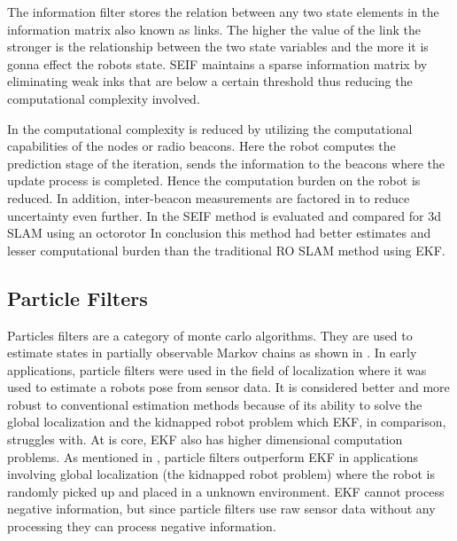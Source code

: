 \documentclass[conference]{IEEEtran}
\begin{document}
The information filter stores the relation between any two state elements in the information matrix also known as links. The higher the value of the link the stronger is the relationship between the two state variables and the more it is gonna effect the robots state. SEIF maintains a sparse information matrix by eliminating weak inks that are below a certain threshold thus reducing the computational complexity involved.

In \cite{Torres-Gonzalez2014} the computational complexity is reduced by utilizing the computational capabilities of the nodes or radio  beacons. Here the robot computes the prediction stage of the iteration, sends the information to the beacons where the update process is completed. Hence the computation burden on the robot is reduced. In addition, inter-beacon measurements are factored in to reduce uncertainty even further. In \cite{Torres-Gonzalez2017} the SEIF method is evaluated and compared for 3d SLAM using an octorotor In conclusion this method had better estimates and lesser computational burden than the traditional RO SLAM method using EKF. 



	
	
	

	
\subsection{Particle Filters}      %
Particles filters are a category of monte carlo algorithms. They are used to estimate states in partially observable Markov chains as shown in \cite{Doucet2001}. In  early applications, particle filters were used in the field of localization where it was used to estimate a robots pose from sensor data. It is considered better and more robust to conventional estimation methods because of its ability to solve the global localization \cite{Borenstein1996} and the kidnapped robot problem \cite{Engelson1992} which EKF, in comparison, struggles with. At is core, EKF also has higher dimensional computation problems.
As mentioned in \cite{Thrun2002a}, particle filters outperform EKF in applications involving global localization (the kidnapped robot problem) where the robot is randomly picked up and placed in a unknown environment. 
EKF cannot process negative information, but since particle filters use raw sensor data without any processing they can process negative information\cite{Thrun2002a}. 
\end{document}

